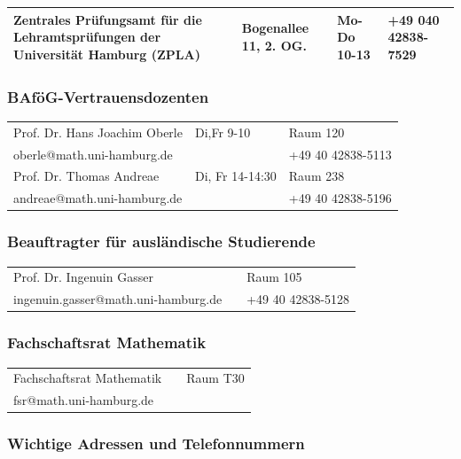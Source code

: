 \begin{tabularx}{\textwidth}{|X|X|X|X|}
\hline Zentrales Prüfungsamt für die Lehramtsprüfungen der Universität Hamburg (ZPLA)&Bogenallee 11, 2. OG.&Mo-Do \hfill 10-13
    &+49 040 42838-7529\\
\hline
\end{tabularx}


\subsubsection{BAföG-Vertrauensdozenten}

\begin{tabularx}{\textwidth}{|X|X|X|}
\hline Prof. Dr. Hans Joachim Oberle&Di,Fr \hfill 9-10&Raum 120\\
       oberle@math.uni-hamburg.de&&+49 40 42838-5113\\
\hline Prof. Dr. Thomas Andreae&Di, Fr \hfill 14-14:30&Raum 238\\
       andreae@math.uni-hamburg.de&&+49 40 42838-5196\\
\hline
\end{tabularx}

\subsubsection{Beauftragter für ausländische Studierende}
\begin{tabularx}{\textwidth}{|X|X|X|}
\hline Prof. Dr. Ingenuin Gasser& \hfill &Raum 105\\
       ingenuin.gasser@math.uni-hamburg.de&&+49 40 42838-5128\\
\hline
\end{tabularx}

\subsubsection{Fachschaftsrat Mathematik}

\begin{tabularx}{\textwidth}{|X|X|X|}
\hline Fachschaftsrat Mathematik&&Raum T30\\
       fsr@math.uni-hamburg.de&&\\
\hline
\end{tabularx}

\subsubsection{Wichtige Adressen und Telefonnummern}


